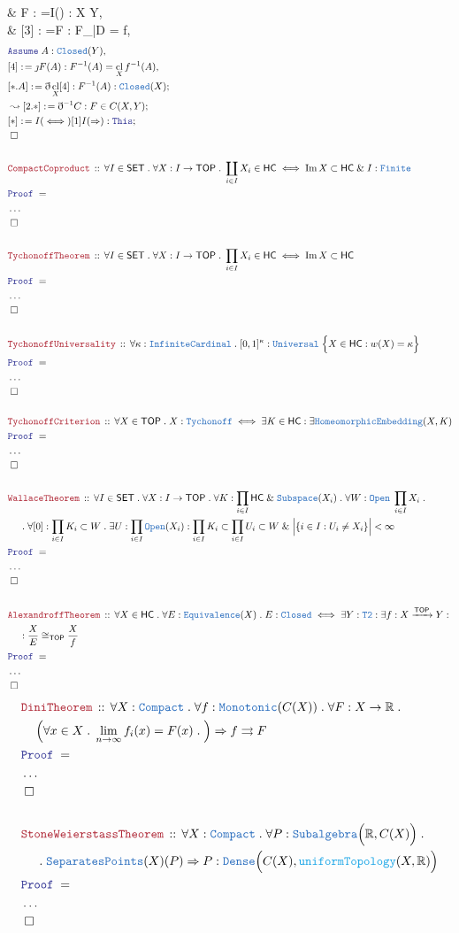 \documentclass[12pt]{scrartcl}
\newcommand{\TYPE}[1]{\textcolor{NavyBlue}{\mathtt{#1}}}
\newcommand{\FUNC}[1]{\textcolor{Cerulean}{\mathtt{#1}}}
\newcommand{\LOGIC}[1]{\textcolor{Blue}{\mathtt{#1}}}
\newcommand{\THM}[1]{\textcolor{Maroon}{\mathtt{#1}}}
\renewcommand{\.}{\; . \;}
\newcommand{\de}{: \kern 0.1pc =}
\newcommand{\Theorem}[2]{& \THM{#1} \, :: \, #2 \\ & \Proof = \\ }
\newcommand{\NewLine}{\\ & \kern 1pc}
\newcommand{\Page}[1]{ \begin{align*} #1 \end{align*}   }
\newcommand{ \bd }{ \ByDef }
\newcommand{\NoProof}{ & \ldots \\ \EndProof}
\renewcommand{\And}{\; \& \;}
\newcommand{\Imply}{\Rightarrow}
\newcommand{\Reals}{\mathbb{R} }
\DeclareMathOperator*{\im}{Im}
\newcommand{\Arrow}{\xrightarrow}
\newcommand{\Say}[3]{& #1 \de #2 : #3, \\}
\newcommand{\Conclude}[3]{& #1 \de #2 : #3; \\}
\newcommand{\Derive}[3]{& \leadsto #1 \de #2 : #3, \\}
\newcommand{\DeriveConclude}[3]{& \leadsto #1 \de #2 : #3 ; \\}
\newcommand{\Assume}[2]{& \LOGIC{Assume} \; #1 : #2, \\}
\newcommand{\QED}{\; \square}
\newcommand{\EndProof}{& \QED \\}
\newcommand{\ByDef}{\eth}
\newcommand{\ByConstr}{\jmath}
\newcommand{\Proof}{\LOGIC{Proof} \; }
\newcommand{\SET}{\mathsf{SET}}
\DeclareMathOperator*{\cl}{cl}
\newcommand{\TOP}{\mathsf{TOP}}
\newcommand{\HC}{\mathsf{HC}}
\begin{document}
{	\Derive{F}{I(\to)}{X \to Y}
	\Say{[3]}{\ByConstr F}{F_{|D} = f}
}\Page{
	\Assume{A}{\TYPE{Closed}(Y)}
	\Say{[4]}{\ByConstr F(A)}{F^{-1}(A) = \cl_X f^{-1}(A)}
	\Conclude{[*.A]}{\bd \cl_X [4]}{ F^{-1}(A) : \TYPE{Closed}(X) }
	\DeriveConclude{[2.*]}{\bd^{-1} C}{F \in C(X,Y)}
	\Conclude{[*]}{I(\iff)[1]I(\Imply)}{\LOGIC{This}}
	\EndProof
	\\
	\Theorem{CompactCoproduct}
	{
		\forall I \in \SET \.
		\forall X : I \to \TOP \.
		\coprod_{i \in I} X_i \in \HC  
		\iff
		\im X \subset \HC \And I : \TYPE{Finite}
	}
	\NoProof
	\\
	\Theorem{TychonoffTheorem}
	{
		\forall I \in \SET \.
		\forall X : I \to \TOP \.
		\prod_{i \in I} X_i \in \HC \iff \im X \subset \HC   
	}
	\NoProof
	\\
	\Theorem{TychonoffUniversality}
	{
		\forall \kappa : \TYPE{InfiniteCardinal} \. 
		[0,1]^\kappa : \TYPE{Universal} \;  \Big\{ X \in \HC : w(X) = \kappa \Big\}
	}
	\NoProof
	\\
	\Theorem{TychonoffCriterion}
	{
		\forall X  \in \TOP \.
		X : \TYPE{Tychonoff} 
		\iff
		\exists K \in \HC : \exists \TYPE{HomeomorphicEmbedding}(X,K)
	}
	\NoProof
	\\
	\Theorem{WallaceTheorem}
	{
		\forall I \in \SET \.
		\forall X : I \to \TOP  \. 
		\forall K : \prod_{i \in I} \HC \And \TYPE{Subspace}(X_i) \.
		\forall W : \TYPE{Open} \; \prod_{i \in I} X_i \. \NewLine \. 
		\forall [0] : \prod_{i \in I} K_i \subset W \.
		\exists U : \prod_{i \in I} \TYPE{Open}(X_i) :
		\prod_{i \in I} K_i \subset \prod_{i \in I} U_i \subset W \And
		\Big|\{ i \in I : U_i \neq X_i\}\Big| < \infty
	}
	\NoProof
	\\
	\Theorem{AlexandroffTheorem}
	{
		\forall X \in \HC \.
		\forall E : \TYPE{Equivalence}(X) \.
		E : \TYPE{Closed} \iff 
		\exists Y : \TYPE{T2} :
		\exists f : X \Arrow{\TOP} Y :
		\NewLine :
		\frac{X}{E} \cong_{\TOP} \frac{X}{f}
	}
	\NoProof
}
\Page{
	\Theorem{DiniTheorem}
	{
		\forall X : \TYPE{Compact} \.
		\forall f : \TYPE{Monotonic}( C(X) ) \.
		\forall F : X \to \Reals \. \NewLine
		\Big(
			\forall x \in X \.
			\lim_{n \to \infty} f_i(x) = F(x) \.
		\Big) \Imply
		f \rightrightarrows F
	}
	\NoProof
	\\
	\Theorem{StoneWeierstassTheorem}
	{
		\forall X : \TYPE{Compact} \.
		\forall P : \TYPE{Subalgebra}\Big( \Reals, C(X) \Big) \. \NewLine \.
		\TYPE{SeparatesPoints}(X)(P) \Imply  P : \TYPE{Dense}\Big( C(X), \FUNC{uniformTopology}(X,\Reals) \Big)
	}
	\NoProof
}
\newpage
\end{document}
